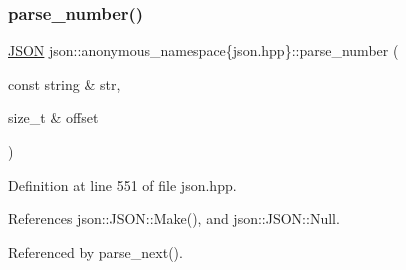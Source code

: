 \subsubsection{\texorpdfstring{parse\+\_\+number()}{parse\_number()}}
{\footnotesize\ttfamily \mbox{\hyperlink{classjson_1_1_j_s_o_n}{J\+S\+ON}} json\+::anonymous\+\_\+namespace\{json.\+hpp\}\+::parse\+\_\+number (\begin{DoxyParamCaption}\item[{const string \&}]{str,  }\item[{size\+\_\+t \&}]{offset }\end{DoxyParamCaption})}



Definition at line 551 of file json.\+hpp.



References json\+::\+J\+S\+O\+N\+::\+Make(), and json\+::\+J\+S\+O\+N\+::\+Null.



Referenced by parse\+\_\+next().


